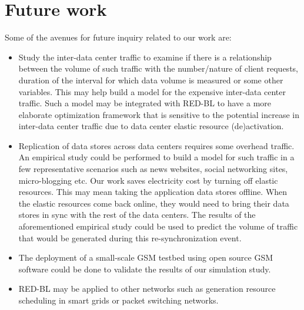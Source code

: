 \section{Future work} Some of the avenues for future inquiry related to our work are:

\begin{itemize}
\item Study the inter-data center traffic to examine if there is a relationship between the volume of such traffic with the number/nature of client requests, duration of the interval for which data volume is measured or some other variables. This may help build a model for the expensive inter-data center traffic. Such a model may be integrated with RED-BL to have a more elaborate optimization framework that is sensitive to the potential increase in inter-data center traffic due to data center elastic resource (de)activation.
\item Replication of data stores across data centers requires some overhead traffic. An empirical study could be performed to build a model for such traffic in a few representative scenarios such as news websites, social networking sites, micro-blogging etc. Our work saves electricity cost by turning off elastic resources. This may mean taking the application data stores offline. When the elastic resources come back online, they would need to bring their data stores in sync with the rest of the data centers. The results of the aforementioned empirical study could be used to predict the volume of traffic that would be generated during this re-synchronization event.
\item The deployment of a small-scale GSM testbed using open source GSM software could be done to validate the results of our simulation study.
\item RED-BL may be applied to other networks such as generation resource scheduling in smart grids or packet switching networks.
\end{itemize}
